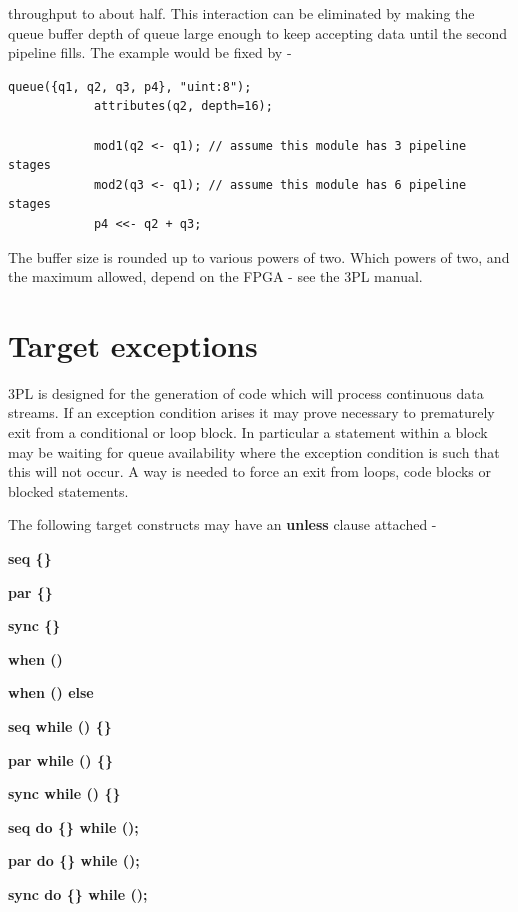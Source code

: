         throughput to about half. This interaction can be eliminated by making the queue
        buffer depth of queue  large enough to keep accepting data until the
        second pipeline fills. The example would be fixed by -
        \begin{lstlisting}[language=threepl]
            queue({q1, q2, q3, p4}, "uint:8");
            attributes(q2, depth=16);

            mod1(q2 <- q1); // assume this module has 3 pipeline stages
            mod2(q3 <- q1); // assume this module has 6 pipeline stages
            p4 <<- q2 + q3;      
        \end{lstlisting}
        The buffer size is rounded up to various powers of two. Which powers of
        two, and the maximum allowed, depend on the FPGA - see the 3PL manual.




    \section{Target exceptions}

        3PL is designed for the generation of code which will process continuous
        data streams. If an exception condition arises it may prove necessary to
        prematurely exit from a conditional or loop block. In particular a
        statement within a block may be waiting for queue availability where
        the exception condition is such that this will not occur. A way is
        needed to force an exit from loops, code blocks or blocked statements.

        The following target constructs may have an {\bf unless} clause attached -
        \blist
        \item   {\bf seq \{\}}
        \item   {\bf par \{\}}
        \item   {\bf sync \{\}}
        \item   {\bf when ()}
        \item   {\bf when () else}
        \item   {\bf seq while () \{\}}
        \item   {\bf par while () \{\}}
        \item   {\bf sync while () \{\}}
        \item   {\bf seq do \{\} while ();}
        \item   {\bf par do \{\} while ();}
        \item   {\bf sync do \{\} while ();}
        \blend

